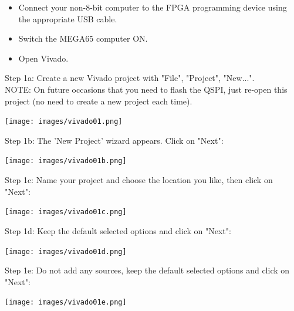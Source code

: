 \begin{itemize}
  \item Connect your non-8-bit computer to the FPGA programming device using the appropriate USB cable.
  \item Switch the MEGA65 computer ON.
  \item Open Vivado.
\end{itemize}


\begin{minipage}{\linewidth}
  Step 1a: Create a new Vivado project with "File", "Project", "New...". \\
  NOTE: On future occasions that you need to flash the QSPI, just re-open this project (no need to create a new project each time).  \\
  \begin{center}
    \texttt{[image: images/vivado01.png]}
  \end{center}
\end{minipage}

\vspace{5mm}

\begin{minipage}{\linewidth}
  Step 1b: The 'New Project' wizard appears. Click on "Next": \\
  \begin{center}
    \texttt{[image: images/vivado01b.png]}
  \end{center}
\end{minipage}

\begin{minipage}{\linewidth}
  Step 1c: Name your project and choose the location you like, then click on "Next":\\
  \begin{center}
    \texttt{[image: images/vivado01c.png]}
  \end{center}
\end{minipage}

\vspace{5mm}

\begin{minipage}{\linewidth}
  Step 1d: Keep the default selected options and click on "Next": \\
  \begin{center}
    \texttt{[image: images/vivado01d.png]}
  \end{center}
\end{minipage}

\begin{minipage}{\linewidth}
  Step 1e: Do not add any sources, keep the default selected options and click on "Next": \\
  \begin{center}
    \texttt{[image: images/vivado01e.png]}
  \end{center}
\end{minipage}

